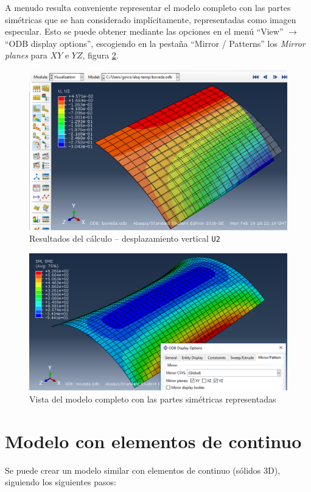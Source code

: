\documentclass[spanish,a4paper,12pt]{article}
\begin{document}
A menudo resulta conveniente representar el modelo completo con las partes simétricas que se han considerado implícitamente, representadas como imagen especular. 
Esto se puede obtener mediante las opciones en el menú ``View'' $\to$ ``ODB display options'', escogiendo en la pestaña ``Mirror / Patterns'' los \emph{Mirror planes} para $XY$ e $YZ$,
figura \ref{fig:job-results-symm}.
\begin{figure}[h!tp]
\centering
\includegraphics[scale=0.45]{capturas2019/a_fig23.png}
\caption{Resultados del cálculo -- desplazamiento vertical \texttt{U2}}
\label{fig:job-results}
\end{figure}
\begin{figure}[h!tp]
\centering
\includegraphics[scale=0.45]{capturas2019/a_fig24p.png}
\caption{Vista del modelo completo con las partes simétricas representadas}
\label{fig:job-results-symm}
\end{figure}
\clearpage

\section{Modelo con elementos de continuo}
Se puede crear un modelo similar con elementos de continuo (sólidos 3D), siguiendo los siguientes pasos:
\end{document}

